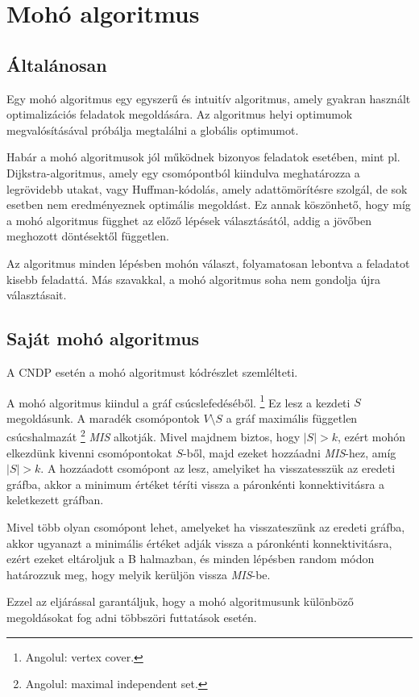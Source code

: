\section{Mohó algoritmus}\label{sec:MOHO_ALGORITMUS}

\subsection{Általánosan}
Egy mohó algoritmus egy egyszerű és intuitív algoritmus, amely gyakran használt
optimalizációs feladatok megoldására. Az algoritmus helyi optimumok megvalósításával próbálja
megtalálni a globális optimumot.

Habár a mohó algoritmusok jól működnek bizonyos feladatok esetében,
mint pl. Dijkstra-algoritmus, amely egy csomópontból kiindulva meghatározza a legrövidebb utakat,
vagy Huffman-kódolás, amely adattömörítésre szolgál, de sok esetben nem eredményeznek optimális megoldást.
Ez annak köszönhető, hogy míg a mohó algoritmus függhet az előző lépések választásától,
addig a jövőben meghozott döntésektől független.

Az algoritmus minden lépésben mohón választ, folyamatosan lebontva a feladatot kisebb feladattá.
Más szavakkal, a mohó algoritmus soha nem gondolja újra választásait.

\subsection{Saját mohó algoritmus}
A CNDP esetén a mohó algoritmust  kódrészlet szemlélteti.


A mohó algoritmus kiindul a gráf csúcslefedéséből.
\footnote{
  Angolul: vertex cover.
}
Ez lesz a kezdeti $S$ megoldásunk.
A maradék csomópontok $V \setminus S$  a gráf maximális független csúcshalmazát
\footnote{
  Angolul: maximal independent set.
}
\emph{MIS} alkotják.
Mivel majdnem biztos, hogy $|S| > k$, ezért mohón elkezdünk kivenni csomópontokat $S$-ből,
majd ezeket hozzáadni \emph{MIS}-hez, amíg $|S| > k$.
A hozzáadott csomópont az lesz, amelyiket ha visszatesszük az eredeti gráfba,
akkor a minimum értéket téríti vissza a páronkénti konnektivitásra a keletkezett gráfban.

Mivel több olyan csomópont lehet, amelyeket ha visszateszünk az eredeti gráfba,
akkor ugyanazt a minimális értéket adják vissza a páronkénti konnektivitásra,
ezért ezeket eltároljuk a B halmazban, és minden lépésben random módon határozzuk meg,
hogy melyik kerüljön vissza \emph{MIS}-be.

Ezzel az eljárással garantáljuk, hogy a mohó algoritmusunk különböző megoldásokat fog adni
többszöri futtatások esetén.
